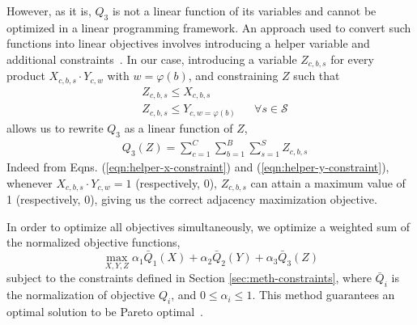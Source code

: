 However, as it is, $Q_3$ is not a linear function of its variables and cannot be
optimized in a linear programming framework. An approach used to convert such
functions into linear objectives involves introducing a helper variable and
additional constraints~\cite{hammer_boolean_1968}. In our case, introducing a
variable $Z_{c, b, s}$ for every product $X_{c, b, s} \cdot Y_{c, w}$ with $w =
\varphi(b)$, and constraining $Z$ such that 
\begin{align}
&Z_{c, b, s} \leq X_{c, b, s} \label{eqn:helper-x-constraint}\\
&Z_{c, b, s} \leq Y_{c, w=\varphi(b)} &&\forall s\in\mathcal{S}
\label{eqn:helper-y-constraint}
\end{align}
allows us to rewrite $Q_3$ as a linear function of $Z$,
\begin{align}
&Q_3(Z) = \sum_{c=1}^{C} \sum_{b=1}^{B} \sum_{s=1}^{S} Z_{c, b, s}
\end{align}
Indeed from Eqns. (\ref{eqn:helper-x-constraint}) and
(\ref{eqn:helper-y-constraint}),  whenever $X_{c, b, s} \cdot Y_{c, w} = 1$
(respectively, 0), $Z_{c, b, s}$ can attain a maximum value of 1 (respectively,
0), giving us the correct adjacency maximization objective.

In order to optimize all objectives simultaneously, we optimize a weighted sum
of the normalized objective functions,
\begin{equation}
\max_{X, Y, Z} \alpha_1 \bar{Q}_1(X) + \alpha_2 \bar{Q}_2(Y) + \alpha_3
\bar{Q}_3(Z)
\end{equation}
subject to the constraints defined in Section \ref{sec:meth-constraints},
where $\bar{Q}_i$ is the normalization of objective $Q_i$, and $0 \leq \alpha_i \leq 1$. 
This method guarantees an optimal solution to be Pareto optimal~\cite{stanimirovic_linear_2011}. 

